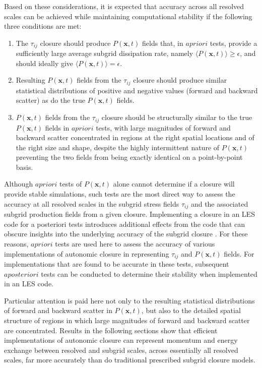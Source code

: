 Based on these considerations, it is expected that accuracy across all resolved scales can be achieved while maintaining computational stability if the following three conditions are met:
%
\begin{enumerate} 
	\item {The  $\tau_{ij}$  closure should produce  $P(\mathbf{x},t)$  fields that, in $a priori$ tests, provide a sufficiently large average subgrid dissipation rate, namely $\langle P(\mathbf{x},t)\rangle \geq \epsilon$, and should ideally give  $\langle P(\mathbf{x},t)\rangle = \epsilon$.}
	\item {Resulting  $P(\mathbf{x},t)$  fields from the   $\tau_{ij}$   closure should produce similar statistical distributions of positive and negative values (forward and backward scatter) as do the true $P(\mathbf{x},t)$  fields.}
	\item {$P(\mathbf{x},t)$  fields from the  $\tau_{ij}$  closure should be structurally similar to the true  $P(\mathbf{x},t)$  fields in   $a priori$   tests, with large magnitudes of forward and backward scatter concentrated in regions at the right spatial locations and of the right size and shape, despite the highly intermittent nature of  $P(\mathbf{x},t)$  preventing the two fields from being exactly identical on a point-by-point basis.}
\end{enumerate}
%
%
Although   $a priori$   tests of  $P(\mathbf{x},t)$  alone cannot determine if a closure will provide stable simulations, such tests are the most direct way to assess the accuracy at all resolved scales in the subgrid stress fields  $\tau_{ij}$   and the associated subgrid production fields   from a given closure. Implementing a closure in an LES code for a posteriori tests introduces additional effects from the code that can obscure insights into the underlying accuracy of the subgrid closure \cite{meneveau2000scale}. For these reasons,   $a priori$   tests are used here to assess the accuracy of various implementations of autonomic closure in representing   $\tau_{ij}$   and   $P(\mathbf{x},t)$  fields. For implementations that are found to be accurate in these tests, subsequent   $a posteriori$   tests can be conducted to determine their stability when implemented in an LES code.

Particular attention is paid here not only to the resulting statistical distributions of forward and backward scatter in   $P(\mathbf{x},t)$,   but also to the detailed spatial structure of regions in which large magnitudes of forward and backward scatter are concentrated. Results in the following sections show that efficient implementations of autonomic closure can represent momentum and energy exchange between resolved and subgrid scales, across essentially all resolved scales, far more accurately than do traditional prescribed subgrid closure models. 


